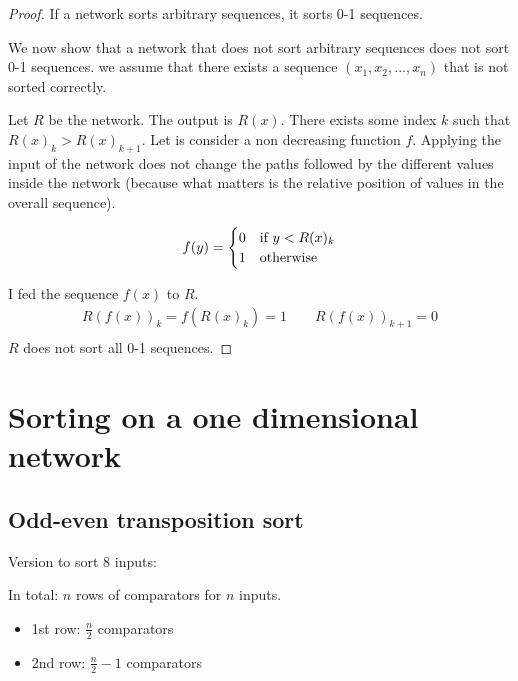 \begin{proof}
If a network sorts arbitrary sequences, it sorts 0-1 sequences.

We now show that a network that does not sort arbitrary sequences does not sort 0-1 sequences. we assume that there exists a sequence $(x_1, x_2, ..., x_n)$ that is not sorted correctly.

Let $R$ be the network. The output is $R(x)$. There exists some index $k$ such that $R(x)_k>R(x)_{k+1}$. Let is consider a non decreasing function $f$. Applying the input of the network does not change the paths followed by the different values inside the network (because what matters is the relative position of values in the overall sequence).

\begin{align*}
f(y)=\begin{cases}
0 & $if $ y<R(x)_k \\
1 & $otherwise$\\
\end{cases}
\end{align*}

I fed the sequence $f(x)$ to $R$.
\begin{align*}
R(f(x))_k = f(R(x)_k)=1 \qquad R(f(x))_{k+1}=0\\
\end{align*}
$R$ does not sort all 0-1 sequences.
\end{proof}


\section{Sorting on a one dimensional network}
\subsection{Odd-even transposition sort}


Version to sort 8 inputs:

In total: $n$ rows of comparators for $n$ inputs.

\newpage

\begin{itemize}
\item 1st row: $\frac{n}{2}$ comparators
\item 2nd row: $\frac{n}{2}-1$ comparators
\end{itemize}

